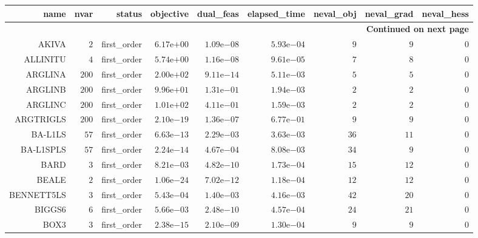 \begin{longtable}{rrrrrrrrr}
\hline
name & nvar & status & objective & dual\_feas & elapsed\_time & neval\_obj & neval\_grad & neval\_hess \\\hline
\endhead
\hline
\multicolumn{9}{r}{{\bfseries Continued on next page}}\\
\hline
\endfoot
\endlastfoot
AKIVA & \(     2\) & first\_order & \( 6.17\)e\(+00\) & \( 1.09\)e\(-08\) & \( 5.93\)e\(-04\) & \(     9\) & \(     9\) & \(     0\) \\
ALLINITU & \(     4\) & first\_order & \( 5.74\)e\(+00\) & \( 1.16\)e\(-08\) & \( 9.61\)e\(-05\) & \(     7\) & \(     8\) & \(     0\) \\
ARGLINA & \(   200\) & first\_order & \( 2.00\)e\(+02\) & \( 9.11\)e\(-14\) & \( 5.11\)e\(-03\) & \(     5\) & \(     5\) & \(     0\) \\
ARGLINB & \(   200\) & first\_order & \( 9.96\)e\(+01\) & \( 1.31\)e\(-01\) & \( 1.94\)e\(-03\) & \(     2\) & \(     2\) & \(     0\) \\
ARGLINC & \(   200\) & first\_order & \( 1.01\)e\(+02\) & \( 4.11\)e\(-01\) & \( 1.59\)e\(-03\) & \(     2\) & \(     2\) & \(     0\) \\
ARGTRIGLS & \(   200\) & first\_order & \( 2.10\)e\(-19\) & \( 1.36\)e\(-07\) & \( 6.77\)e\(-01\) & \(     9\) & \(     9\) & \(     0\) \\
BA-L1LS & \(    57\) & first\_order & \( 6.63\)e\(-13\) & \( 2.29\)e\(-03\) & \( 3.63\)e\(-03\) & \(    36\) & \(    11\) & \(     0\) \\
BA-L1SPLS & \(    57\) & first\_order & \( 2.24\)e\(-14\) & \( 4.67\)e\(-04\) & \( 8.08\)e\(-03\) & \(    34\) & \(     9\) & \(     0\) \\
BARD & \(     3\) & first\_order & \( 8.21\)e\(-03\) & \( 4.82\)e\(-10\) & \( 1.73\)e\(-04\) & \(    15\) & \(    12\) & \(     0\) \\
BEALE & \(     2\) & first\_order & \( 1.06\)e\(-24\) & \( 7.02\)e\(-12\) & \( 1.18\)e\(-04\) & \(    12\) & \(    12\) & \(     0\) \\
BENNETT5LS & \(     3\) & first\_order & \( 5.43\)e\(-04\) & \( 1.40\)e\(-03\) & \( 4.16\)e\(-03\) & \(    42\) & \(    20\) & \(     0\) \\
BIGGS6 & \(     6\) & first\_order & \( 5.66\)e\(-03\) & \( 2.48\)e\(-10\) & \( 4.57\)e\(-04\) & \(    24\) & \(    21\) & \(     0\) \\
BOX3 & \(     3\) & first\_order & \( 2.38\)e\(-15\) & \( 2.10\)e\(-09\) & \( 1.30\)e\(-04\) & \(     9\) & \(     9\) & \(     0\) \\

\end{longtable}
